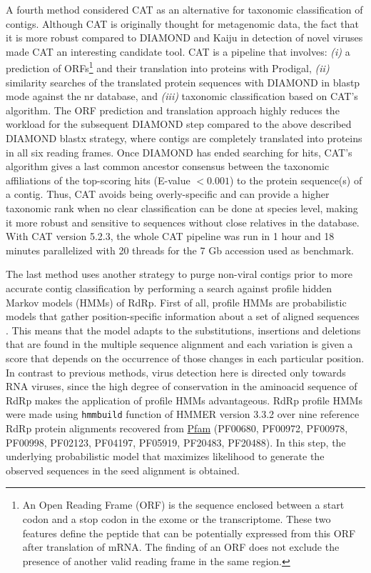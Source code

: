 \documentclass[
  openany]{book}
\begin{document}
A fourth method considered CAT as an alternative for taxonomic classification of contigs. Although CAT is originally thought for metagenomic data, the fact that it is more robust compared to DIAMOND and Kaiju in detection of novel viruses made CAT an interesting candidate tool. CAT is a pipeline that involves: \emph{(i)} a prediction of ORFs\footnote{An Open Reading Frame (ORF) is the sequence enclosed between a start codon and a stop codon in the exome or the transcriptome. These two features define the peptide that can be potentially expressed from this ORF after translation of mRNA. The finding of an ORF does not exclude the presence of another valid reading frame in the same region.} and their translation into proteins with Prodigal, \emph{(ii)} similarity searches of the translated protein sequences with DIAMOND in blastp mode against the nr database, and \emph{(iii)} taxonomic classification based on CAT's algorithm. The ORF prediction and translation approach highly reduces the workload for the subsequent DIAMOND step compared to the above described DIAMOND blastx strategy, where contigs are completely translated into proteins in all six reading frames. Once DIAMOND has ended searching for hits, CAT's algorithm gives a last common ancestor consensus between the taxonomic affiliations of the top-scoring hits (E-value \(< 0.001\)) to the protein sequence(s) of a contig. Thus, CAT avoids being overly-specific and can provide a higher taxonomic rank when no clear classification can be done at species level, making it more robust and sensitive to sequences without close relatives in the database. With CAT version 5.2.3, the whole CAT pipeline was run in 1 hour and 18 minutes parallelized with 20 threads for the 7 Gb accession used as benchmark.

The last method uses another strategy to purge non-viral contigs prior to more accurate contig classification by performing a search against profile hidden Markov models (HMMs) of RdRp. First of all, profile HMMs are probabilistic models that gather position-specific information about a set of aligned sequences \autocite{Eddy1998}. This means that the model adapts to the substitutions, insertions and deletions that are found in the multiple sequence alignment and each variation is given a score that depends on the occurrence of those changes in each particular position. In contrast to previous methods, virus detection here is directed only towards RNA viruses, since the high degree of conservation in the aminoacid sequence of RdRp makes the application of profile HMMs advantageous. RdRp profile HMMs were made using \texttt{hmmbuild} function of HMMER version 3.3.2 over nine reference RdRp protein alignments recovered from \href{https://pfam.xfam.org/}{Pfam} (PF00680, PF00972, PF00978, PF00998, PF02123, PF04197, PF05919, PF20483, PF20488). In this step, the underlying probabilistic model that maximizes likelihood to generate the observed sequences in the seed alignment is obtained.
\end{document}
